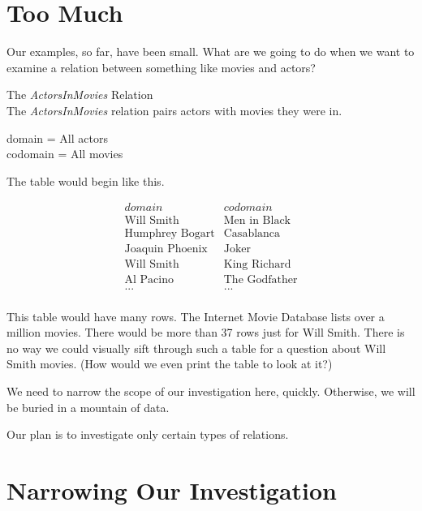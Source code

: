 \documentclass{ximera}
\begin{document}
\section{Too Much}

Our examples, so far, have been small.  What are we going to do when we want to examine a relation between something like movies and actors?  


\begin{example} The \textit{ActorsInMovies} Relation\\
The \textit{ActorsInMovies} relation pairs actors with movies they were in.

domain = All actors \\
codomain = All movies

The table would begin like this.

\[
\begin{array}{l|l}
    domain      & codomain      \\ \hline
    \text{Will Smith}   &  \text{Men in Black} \\
    \text{Humphrey Bogart}   & \text{Casablanca} \\
    \text{Joaquin Phoenix}  &  \text{Joker} \\
    \text{Will Smith}  &  \text{King Richard} \\
    \text{Al Pacino} &  \text{The Godfather} \\ 
    \text{...} &  \text{...} \\ 
\end{array}
\]

\end{example} 


This table would have many rows. The Internet Movie Database lists over a million movies.  There would be more than 37 rows just for Will Smith. There is no way we could visually sift through such a table for a question about Will Smith movies. (How would we even print the table to look at it?)

We need to narrow the scope of our investigation here, quickly. Otherwise, we will be buried in a mountain of data.

Our plan is to investigate only certain types of relations.








\section{Narrowing Our Investigation}
\end{document}
